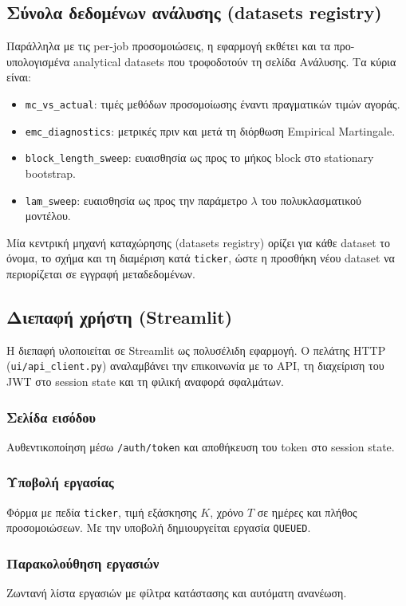 \documentclass[12pt]{article}
\begin{document}
\subsection{Σύνολα δεδομένων ανάλυσης (datasets registry)}
Παράλληλα με τις per-job προσομοιώσεις, η εφαρμογή εκθέτει και τα προ-υπολογισμένα analytical datasets που τροφοδοτούν τη σελίδα Ανάλυσης. Τα κύρια είναι:
\begin{itemize}
  \item \texttt{mc\_vs\_actual}: τιμές μεθόδων προσομοίωσης έναντι πραγματικών τιμών αγοράς.
  \item \texttt{emc\_diagnostics}: μετρικές πριν και μετά τη διόρθωση Empirical Martingale.
  \item \texttt{block\_length\_sweep}: ευαισθησία ως προς το μήκος block στο stationary bootstrap.
  \item \texttt{lam\_sweep}: ευαισθησία ως προς την παράμετρο $\lambda$ του πολυκλασματικού μοντέλου.
\end{itemize}
Μία κεντρική μηχανή καταχώρησης (datasets registry) ορίζει για κάθε dataset το όνομα, το σχήμα και τη διαμέριση κατά \texttt{ticker}, ώστε η προσθήκη νέου dataset να περιορίζεται σε εγγραφή μεταδεδομένων.

\subsection{Διεπαφή χρήστη (Streamlit)}
Η διεπαφή υλοποιείται σε Streamlit ως πολυσέλιδη εφαρμογή. Ο πελάτης HTTP (\texttt{ui/api\_client.py}) αναλαμβάνει την επικοινωνία με το API, τη διαχείριση του JWT στο session state και τη φιλική αναφορά σφαλμάτων.



\subsubsection{Σελίδα εισόδου}
Αυθεντικοποίηση μέσω \texttt{/auth/token} και αποθήκευση του token στο session state.

\subsubsection{Υποβολή εργασίας}
Φόρμα με πεδία \texttt{ticker}, τιμή εξάσκησης $K$, χρόνο $T$ σε ημέρες και πλήθος προσομοιώσεων. Με την υποβολή δημιουργείται εργασία \texttt{QUEUED}.

\subsubsection{Παρακολούθηση εργασιών}
Ζωντανή λίστα εργασιών με φίλτρα κατάστασης και αυτόματη ανανέωση.
\end{document}
